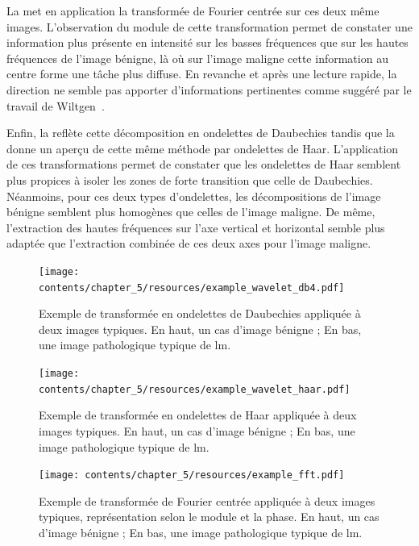 La  met en application la transformée de Fourier centrée sur ces deux même images. L'observation du module de cette transformation permet de constater une information plus présente en intensité sur les basses fréquences que sur les hautes fréquences de l'image bénigne, là où sur l'image maligne cette information au centre forme une tâche plus diffuse. En revanche et après une lecture rapide, la direction ne semble pas apporter d'informations pertinentes comme suggéré par le travail de Wiltgen~.\par

Enfin, la  reflète cette décomposition en ondelettes de Daubechies tandis que la  donne un aperçu de cette même méthode par ondelettes de Haar. L'application de ces transformations permet de constater que les ondelettes de Haar semblent plus propices à isoler les zones de forte transition que celle de Daubechies. Néanmoins, pour ces deux types d'ondelettes, les décompositions de l'image bénigne semblent plus homogènes que celles de l'image maligne. De même, l'extraction des hautes fréquences sur l'axe vertical et horizontal semble plus adaptée que l'extraction combinée de ces deux axes pour l'image maligne.\par


\begin{landscape}
\begin{figure}[H]
    \centering
    \texttt{[image: contents/chapter\_5/resources/example\_wavelet\_db4.pdf]}
    \caption{Exemple de transformée en ondelettes de Daubechies appliquée à deux images typiques. En haut, un cas d'image bénigne ; En bas, une image pathologique typique de \gls{lm}.}
    \label{fig:example_wavelet_db4}
\end{figure}\par

\begin{figure}[H]
    \centering
    \texttt{[image: contents/chapter\_5/resources/example\_wavelet\_haar.pdf]}
    \caption{Exemple de transformée en ondelettes de Haar appliquée à deux images typiques. En haut, un cas d'image bénigne ; En bas, une image pathologique typique de \gls{lm}.}
    \label{fig:example_wavelet_haar}
\end{figure}\par

\end{landscape}

\begin{figure}[H]
    \centering
    \texttt{[image: contents/chapter\_5/resources/example\_fft.pdf]}
    \caption{Exemple de transformée de Fourier centrée appliquée à deux images typiques, représentation selon le module et la phase. En haut, un cas d'image bénigne ; En bas, une image pathologique typique de \gls{lm}.}
    \label{fig:example_fft}
\end{figure}\par

